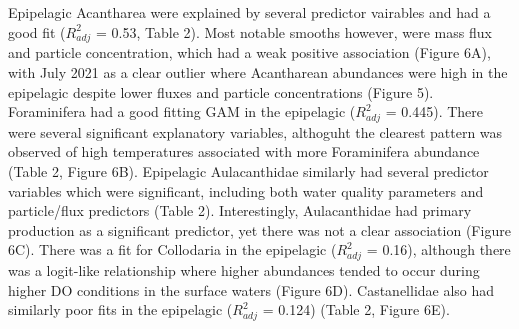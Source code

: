 \documentclass[
]{article}
\begin{document}
Epipelagic Acantharea were explained by several predictor vairables and
had a good fit (\(R^2_{adj}\) = 0.53, Table 2). Most notable smooths
however, were mass flux and particle concentration, which had a weak
positive association (Figure 6A), with July 2021 as a clear outlier
where Acantharean abundances were high in the epipelagic despite lower
fluxes and particle concentrations (Figure 5). Foraminifera had a good
fitting GAM in the epipelagic (\(R^2_{adj}\) = 0.445). There were
several significant explanatory variables, althoguht the clearest
pattern was observed of high temperatures associated with more
Foraminifera abundance (Table 2, Figure 6B). Epipelagic Aulacanthidae
similarly had several predictor variables which were significant,
including both water quality parameters and particle/flux predictors
(Table 2). Interestingly, Aulacanthidae had primary production as a
significant predictor, yet there was not a clear association (Figure
6C). There was a fit for Collodaria in the epipelagic (\(R^2_{adj}\) =
0.16), although there was a logit-like relationship where higher
abundances tended to occur during higher DO conditions in the surface
waters (Figure 6D). Castanellidae also had similarly poor fits in the
epipelagic (\(R^2_{adj}\) = 0.124) (Table 2, Figure 6E).
\end{document}
